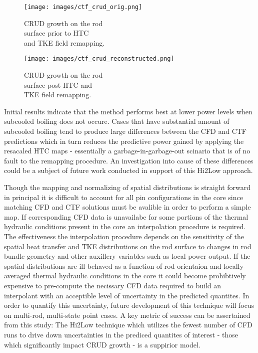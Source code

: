 \begin{figure}[!htbp]
\centering
\begin{minipage}{.45\textwidth}
  \texttt{[image: images/ctf\_crud\_orig.png]}
\caption{CRUD growth on the rod \\ surface prior to HTC \\ and TKE field remapping.}
\label{fig:crud_pre_map}
\end{minipage}%
\begin{minipage}{.45\textwidth}
  \texttt{[image: images/ctf\_crud\_reconstructed.png]}
\caption{CRUD growth on the rod \\ surface post HTC and \\ TKE field remapping.}
\label{fig:crud_post_map}
\end{minipage}
\end{figure}

Initial results indicate that the method performs best at lower power levels when subcooled boiling does not occure.  Cases that have substantial amount of subcooled boiling tend to produce large differences between the CFD and CTF predictions which in turn reduces the predictive power gained by applying the resacaled HTC maps - essentially a garbage-in-garbage-out scinario that is of no fault to the remapping procedure.  An investigation into cause of these differences could be a subject of future work conducted in support of this Hi2Low approach.  

Though the mapping and normalizing of spatial distributions is straight forward in principal it is difficult to account for all pin configurations in the core since matching CFD and CTF solutions must be avalible in order to perform a simple map.  If corresponding CFD data is unavailabe for some portions of the thermal hydraulic conditions present in the core an interpolation procedure is required.  The effectiveness the interpolation procedure depends on the sensitivity of the spatial heat transfer and TKE distributions on the rod surface to changes in rod bundle geometry and other auxillery variables such as local power output.  If the spatial distributions are ill behaved as a function of rod orientaion and locally-averaged thermal hydraulic conditions in the core it could become prohibtively expensive to pre-compute the necissary CFD data required to build an interpolant with an acceptible level of uncertainty in the predicted quantites.  In order to quantify this uncertainty, future development of this technique will focus on multi-rod, multi-state point cases.
A key metric of success can be assertained from this study:  The Hi2Low technique which utilizes the fewest number of CFD runs to drive down uncertainties in the prediced quantites of interest - those which significantly impact CRUD growth - is a suppirior model.

